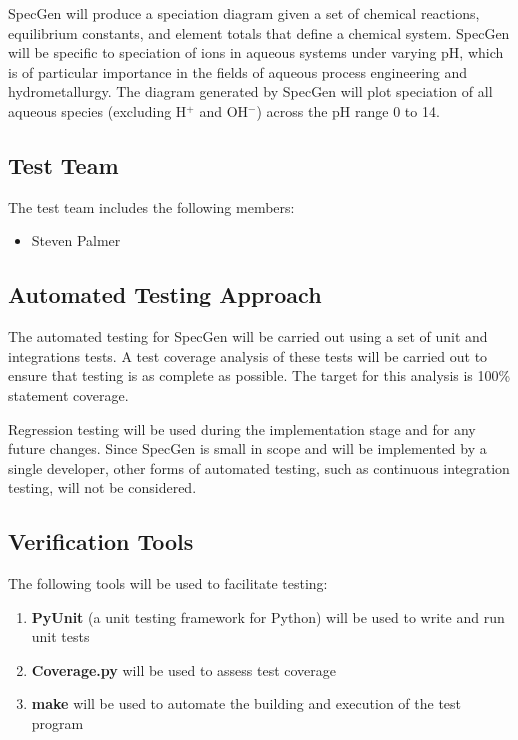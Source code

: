 \documentclass[12pt, titlepage]{article}
\newcommand{\progname}{SpecGen}
\begin{document}
\progname{} will produce a speciation diagram given a set of chemical reactions, 
equilibrium constants, and element totals that define a chemical system.  
\progname{} will be specific to speciation of ions in aqueous systems under 
varying pH, which is of particular importance in the fields of aqueous process 
engineering and hydrometallurgy.  The diagram generated by \progname{} will plot 
speciation of all aqueous species (excluding H$^+$ and OH$^-$) across the pH 
range 0 to 14.

\subsection{Test Team}
The test team includes the following members:
\begin{itemize}
\item Steven Palmer
\end{itemize}

\subsection{Automated Testing Approach}
The automated testing for \progname{} will be carried out using a set of unit 
and integrations tests.  A test coverage analysis of these tests will be 
carried out to ensure that testing is as complete as possible.  The target 
for this analysis is 100\% statement coverage. 

Regression testing will be used during the implementation stage and for any 
future changes.  Since \progname{} is small in scope and will be implemented 
by a single developer, other forms of automated testing, such as continuous 
integration testing, will not be considered.


\subsection{Verification Tools}
The following tools will be used to facilitate testing:

\begin{enumerate}
\item {\bf PyUnit} (a unit testing framework for Python) will be used to write 
  and run unit tests
\item {\bf Coverage.py} will be used to assess test coverage
\item {\bf make} will be used to automate the building and execution of the test 
  program
\end{enumerate}
\end{document}
